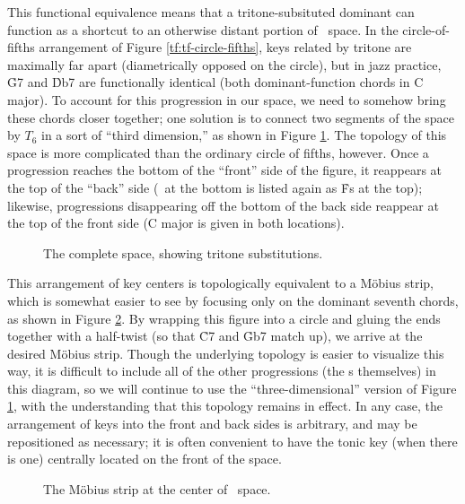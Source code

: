 This functional equivalence means that a tritone-subsituted dominant can
function as a shortcut to an otherwise distant portion of \tf\ space. In the
circle-of-fifths arrangement of Figure \ref{tf:tf-circle-fifths}, keys related
by tritone are maximally far apart (diametrically opposed on the circle), but
in jazz practice, \h{G7} and \h{Db7} are functionally identical (both
dominant-function chords in C major). To account for this progression in our
space, we need to somehow bring these chords closer together; one solution is
to connect two segments of the space by $T_6$ in a sort of ``third
dimension,'' as shown in Figure \ref{tft:complete-space}. The topology of this
space is more complicated than the ordinary circle of fifths, however. Once a
progression reaches the bottom of the ``front'' side of the figure, it
reappears at the top of the ``back'' side (\Gflat\ at the bottom is listed
again as \h{Fs} at the top); likewise, progressions disappearing off the
bottom of the back side reappear at the top of the front side (C major is
given in both locations).

\begin{figure}[thb]
  \caption{The complete \tf space, showing tritone substitutions.}
  \label{tft:complete-space}
\end{figure}



This arrangement of key centers is topologically equivalent to a Möbius strip,
which is somewhat easier to see by focusing only on the dominant seventh
chords, as shown in Figure \ref{tft:mobius-dominants}. By wrapping this figure
into a circle and gluing the ends together with a half-twist (so that \h{C7}
and \h{Gb7} match up), we arrive at the desired Möbius strip. Though
the underlying topology is easier to visualize this way, it is difficult to
include all of the other progressions (the \tf{}s themselves) in this diagram,
so we will continue to use the ``three-dimensional'' version of Figure
\ref{tft:complete-space}, with the understanding that this topology remains in
effect. In any case, the arrangement of keys into the front and back sides is
arbitrary, and may be repositioned as necessary; it is often convenient to
have the tonic key (when there is one) centrally located on the front of the
space.

\begin{figure}[htbp]
  \caption{The Möbius strip at the center of \tf\ space.}
  \label{tft:mobius-dominants}
\end{figure}

